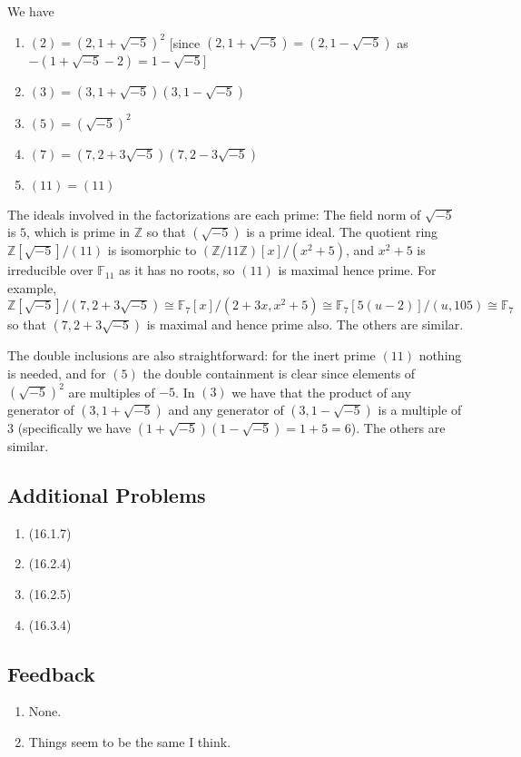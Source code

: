 \documentclass[11pt]{article}
\begin{document}
\begin{enumerate}
\begin{enumerate}
        We have \begin{enumerate}
            \item $(2) = (2,1+\sqrt{-5})^2$ [since $(2,1+\sqrt{-5}) = (2,1-\sqrt{-5})$ as $-(1+\sqrt{-5}-2)=1-\sqrt{-5}$]
            \item $(3) = (3,1+\sqrt{-5})(3,1-\sqrt{-5})$
            \item $(5)=(\sqrt{-5})^2$
            \item $(7) = (7,2+3\sqrt{-5})(7,2-3\sqrt{-5})$
            \item $(11) = (11)$
        \end{enumerate}
        The ideals involved in the factorizations are each prime: The field norm of $\sqrt{-5}$ is $5$, which is prime in $\mathbb{Z}$ so that $(\sqrt{-5})$ is a prime ideal. The quotient ring $\mathbb{Z}[\sqrt{-5}]/(11)$ is isomorphic to $(\mathbb{Z}/11\mathbb{Z})[x]/(x^2+5)$, and $x^2+5$ is irreducible over $\mathbb{F}_{11}$ as it has no roots, so $(11)$ is maximal hence prime. For example, $\mathbb{Z}[\sqrt{-5}]/(7,2+3\sqrt{-5})\cong \mathbb{F}_7[x]/(2+3x,x^2+5)\cong \mathbb{F}_7[5(u-2)]/(u,105)\cong \mathbb{F}_7$ so that $(7,2+3\sqrt{-5})$ is maximal and hence prime also. The others are similar.

        The double inclusions are also straightforward: for the inert prime $(11)$ nothing is needed, and for $(5)$ the double containment is clear since elements of $(\sqrt{-5})^2$ are multiples of $-5$. In $(3)$ we have that the product of any generator of $(3,1+\sqrt{-5})$ and any generator of $(3,1-\sqrt{-5})$ is a multiple of $3$ (specifically we have $(1+\sqrt{-5})(1-\sqrt{-5}) = 1+5=6$). The others are similar.
    \end{enumerate}
\end{enumerate}
\subsection*{Additional Problems}
\begin{enumerate}
    \item (16.1.7)
    \item (16.2.4)
    \item (16.2.5)
    \item (16.3.4)
\end{enumerate}
\subsection*{Feedback}
\begin{enumerate}
    \item None.
    \item Things seem to be the same I think.
\end{enumerate}
\end{document}
